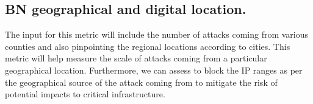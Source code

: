 \subsection{BN geographical and digital location.} The input for this metric will include the number of attacks coming from various counties and also pinpointing the regional locations according to cities. This metric will help measure the scale of attacks coming from a particular geographical location. Furthermore, we can assess to block the IP ranges as per the geographical source of the attack coming from to mitigate the risk of potential impacts to critical infrastructure.


\indent

